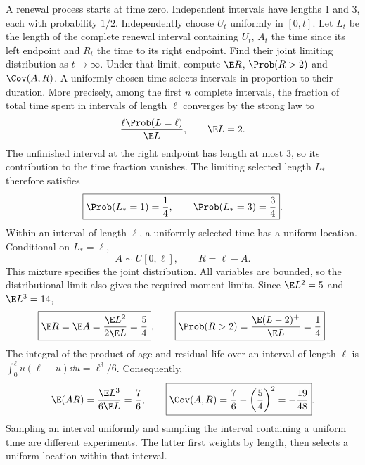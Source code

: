A renewal process starts at time zero. Independent intervals have lengths 1 and 3, each with probability $1/2$. Independently choose $U_t$ uniformly in $[0,t]$. Let $L_t$ be the length of the complete renewal interval containing $U_t$, $A_t$ the time since its left endpoint and $R_t$ the time to its right endpoint. Find their joint limiting distribution as $t\to\infty$. Under that limit, compute $\E R$, $\Prob(R>2)$ and $\Cov(A,R)$.
\solution A uniformly chosen time selects intervals in proportion to their duration. More precisely, among the first $n$ complete intervals, the fraction of total time spent in intervals of length $\ell$ converges by the strong law to
\[
 \frac{\ell\Prob(L=\ell)}{\E L},\qquad \E L=2.
\]
The unfinished interval at the right endpoint has length at most 3, so its contribution to the time fraction vanishes. The limiting selected length $L_*$ therefore satisfies
\[
 \boxed{\Prob(L_*=1)=\frac14,\qquad\Prob(L_*=3)=\frac34}.
\]
Within an interval of length $\ell$, a uniformly selected time has a uniform location. Conditional on $L_*=\ell$,
\[
 \boxed{A\sim U[0,\ell],\qquad R=\ell-A}.
\]
This mixture specifies the joint distribution. All variables are bounded, so the distributional limit also gives the required moment limits. Since $\E L^2=5$ and $\E L^3=14$,
\[
 \boxed{\E R=\E A=\frac{\E L^2}{2\E L}=\frac54},\qquad
 \boxed{\Prob(R>2)=\frac{\E(L-2)^+}{\E L}=\frac14}.
\]
The integral of the product of age and residual life over an interval of length $\ell$ is $\int_0^\ell u(\ell-u)\dd u=\ell^3/6$. Consequently,
\[
 \E(AR)=\frac{\E L^3}{6\E L}=\frac76,
 \qquad \boxed{\Cov(A,R)=\frac76-\left(\frac54\right)^2=-\frac{19}{48}}.
\]
\insight Sampling an interval uniformly and sampling the interval containing a uniform time are different experiments. The latter first weights by length, then selects a uniform location within that interval.


